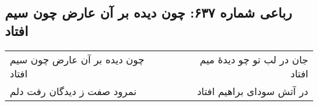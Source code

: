 \begin{center}
\section*{رباعی شماره ۶۳۷: چون دیده بر آن عارض چون سیم افتاد}
\label{sec:0637}
\begin{longtable}{l p{0.5cm} r}
چون دیده بر آن عارض چون سیم افتاد
&&
جان در لب تو چو دیدهٔ میم افتاد
\\
نمرود صفت ز دیدگان رفت دلم
&&
در آتش سودای براهیم افتاد
\\
\end{longtable}
\end{center}
